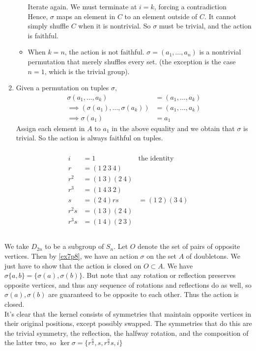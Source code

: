 \documentclass{article}
\newcommand{\set}[1]{ \{ #1 \} }
\begin{document}
\begin{enumerate}
\begin{itemize}
Iterate again. We must terminate at $i=k$, forcing a contradiction\\
Hence, $\sigma$ maps an element in $C$ to an element outside of $C$. It cannot simply shuffle $C$ when it is nontrivial. So $\sigma$ must be trivial, and the action is faithful.
\item When $k=n$, the action is not faithful. $\sigma = (a_1,\ldots,a_n)$ is a nontrivial permutation that merely shuffles every set. (the exception is the case $n=1$, which is the trivial group).
\end{itemize}
\item
Given a permutation on tuples $\sigma$, 
\begin{align*}
\sigma(a_1,\ldots,a_k) &= (a_1,\ldots,a_k)\\
\implies (\sigma(a_1),\ldots,\sigma(a_k)) &= (a_1,\ldots,a_k)\\
\implies \sigma(a_1) &= a_1
\end{align*}
Assign each element in $A$ to $a_1$ in the above equality and we obtain that $\sigma$ is trivial. So the action is always faithful on tuples.
\end{enumerate}
\subsubsection{}\label{ex7p11}
\begin{align*}
i &= 1 & \mbox{the identity}\\
r &= (1\ 2\ 3\ 4)\\
r^2 &= (1\ 3) (2\ 4)\\
r^3 &= (1\ 4\ 3\ 2)\\
s &= (2\ 4)
rs &= (1\ 2)(3\ 4)\\
r^2s &= (1\ 3)(2\ 4)\\
r^3s &= (1\ 4)(2\ 3)\\
\end{align*}
\subsubsection{}\label{ex7p12}
We take $D_{2n}$ to be a subgroup of $S_n$. Let $O$ denote the set of pairs of opposite vertices. Then by \ref{ex7p8}, we have an action $\sigma$ on the set $A$ of doubletons. We just have to show that the action is closed on $O \subset A$. We have $\sigma\set{a,b} = \set{\sigma(a),\sigma(b)}$. But note that any rotation or reflection preserves opposite vertices, and thus any sequence of rotations and reflections do as well, so $\sigma(a),\sigma(b)$ are guaranteed to be opposite to each other. Thus the action is closed.\\
It's clear that the kernel consists of symmetries that maintain opposite vertices in their original positions, except possibly swapped. The symmetries that do this are the trivial symmetry, the reflection, the halfway rotation, and the composition of the latter two, so $\ker\sigma = \set{r^{\frac{n}{2}}, s, r^{\frac{n}{2}}s, i}$
\end{document}

